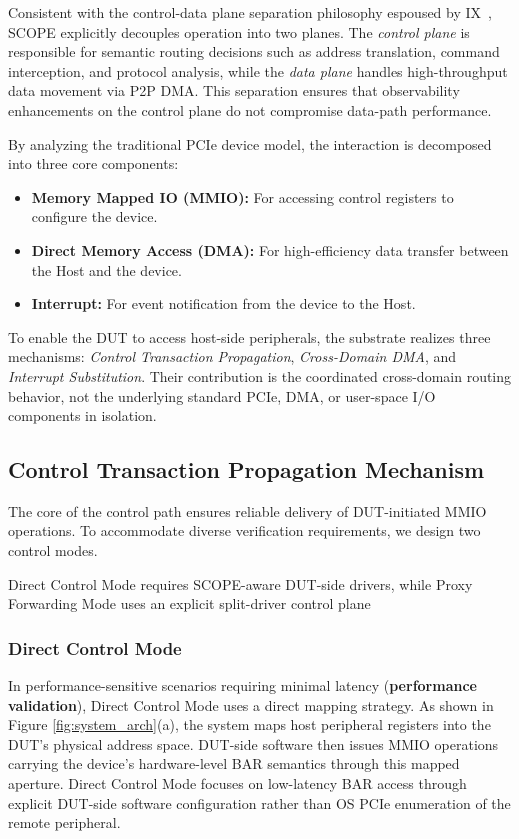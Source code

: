 \documentclass[10pt,conference,letterpaper]{IEEEtran}
\begin{document}
Consistent with the control-data plane separation philosophy espoused by IX~\cite{belay2014ix}, SCOPE explicitly decouples operation into two planes. The \textit{control plane} is responsible for semantic routing decisions such as address translation, command interception, and protocol analysis, while the \textit{data plane} handles high-throughput data movement via P2P DMA. This separation ensures that observability enhancements on the control plane do not compromise data-path performance.

By analyzing the traditional PCIe device model, the interaction is decomposed into three core components:
\begin{itemize}
    \item \textbf{Memory Mapped IO (MMIO):} For accessing control registers to configure the device.
    \item \textbf{Direct Memory Access (DMA):} For high-efficiency data transfer between the Host and the device.
    \item \textbf{Interrupt:} For event notification from the device to the Host.
\end{itemize}

To enable the DUT to access host-side peripherals, the substrate realizes three mechanisms: \textit{Control Transaction Propagation}, \textit{Cross-Domain DMA}, and \textit{Interrupt Substitution}. Their contribution is the coordinated cross-domain routing behavior, not the underlying standard PCIe, DMA, or user-space I/O components in isolation.

\subsection{Control Transaction Propagation Mechanism} \label{sec:design_control}

The core of the control path ensures reliable delivery of DUT-initiated MMIO operations. To accommodate diverse verification requirements, we design two control modes.

Direct Control Mode requires SCOPE-aware DUT-side drivers, while Proxy Forwarding Mode uses an explicit split-driver control plane

\subsubsection{Direct Control Mode} \label{sec:design_direct}
In performance-sensitive scenarios requiring minimal latency (\textbf{performance validation}), Direct Control Mode uses a direct mapping strategy. As shown in Figure \ref{fig:system_arch}(a), the system maps host peripheral registers into the DUT's physical address space. DUT-side software then issues MMIO operations carrying the device's hardware-level BAR semantics through this mapped aperture. Direct Control Mode focuses on low-latency BAR access through explicit DUT-side software configuration rather than OS PCIe enumeration of the remote peripheral.
\end{document}
